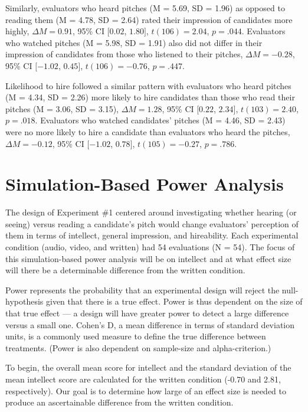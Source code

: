 \documentclass[
  english,
  man]{apa6}
\begin{document}
Similarly, evaluators who heard pitches (M = 5.69, SD = 1.96) as opposed to reading them (M = 4.78, SD = 2.64) rated their impression of candidates more highly, \(\Delta M = 0.91\), 95\% CI \([0.02\), \(1.80]\), \(t(106) = 2.04\), \(p = .044\). Evaluators who watched pitches (M = 5.98, SD = 1.91) also did not differ in their impression of candidates from those who listened to their pitches, \(\Delta M = -0.28\), 95\% CI \([-1.02\), \(0.45]\), \(t(106) = -0.76\), \(p = .447\).

Likelihood to hire followed a similar pattern with evaluators who heard pitches (M = 4.34, SD = 2.26) more likely to hire candidates than those who read their pitches (M = 3.06, SD = 3.15), \(\Delta M = 1.28\), 95\% CI \([0.22\), \(2.34]\), \(t(103) = 2.40\), \(p = .018\). Evaluators who watched candidates' pitches (M = 4.46, SD = 2.43) were no more likely to hire a candidate than evaluators who heard the pitches, \(\Delta M = -0.12\), 95\% CI \([-1.02\), \(0.78]\), \(t(105) = -0.27\), \(p = .786\).

\hypertarget{simulation-based-power-analysis}{%
\section{Simulation-Based Power Analysis}\label{simulation-based-power-analysis}}

The design of Experiment \#1 centered around investigating whether hearing (or seeing) versus reading a candidate's pitch would change evaluators' perception of them in terms of intellect, general impression, and hireability. Each experimental condition (audio, video, and written) had 54 evaluations (N = 54). The focus of this simulation-based power analysis will be on intellect and at what effect size will there be a determinable difference from the written condition.

Power represents the probability that an experimental design will reject the null-hypothesis given that there is a true effect. Power is thus dependent on the size of that true effect --- a design will have greater power to detect a large difference versus a small one. Cohen's D, a mean difference in terms of standard deviation units, is a commonly used measure to define the true difference between treatments. (Power is also dependent on sample-size and alpha-criterion.)

To begin, the overall mean score for intellect and the standard deviation of the mean intellect score are calculated for the written condition (-0.70 and 2.81, respectively). Our goal is to determine how large of an effect size is needed to produce an ascertainable difference from the written condition.
\end{document}
